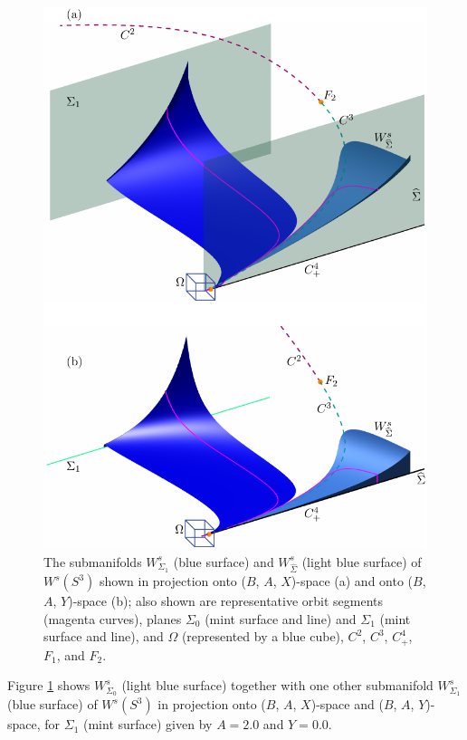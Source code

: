\documentclass{ws-ijbc}
\begin{document}
\begin{figure}[H]
\centering
\includegraphics[]{./figures/MKMO_5.pdf}
\caption{The submanifolds $W^{s}_{\Sigma_1}$ (blue surface) and $W^{s}_{\widehat{\Sigma}}$ (light blue surface) of $W^s(S^3)$ shown in projection onto ($B$, $A$, $X$)-space (a) and onto ($B$, $A$, $Y$)-space (b); also shown are representative orbit segments (magenta curves), planes $\Sigma_0$ (mint surface and line) and $\Sigma_1$ (mint surface and line), and $\Omega$ (represented by a blue cube), $C^2$, $C^3$, $C^4_+$, $F_1$, and $F_2$.}
\label{figure_5}
\end{figure}

Figure \ref{figure_5} shows $W^s_{\Sigma_0}$ (light blue surface) together with one other submanifold $W^{s}_{\Sigma_1}$ (blue surface) of $W^{s}(S^3)$ in projection onto ($B$, $A$, $X$)-space and ($B$, $A$, $Y$)-space, for $\Sigma_1$ (mint surface) given by $A=2.0$ and $Y=0.0$.
\end{document}
